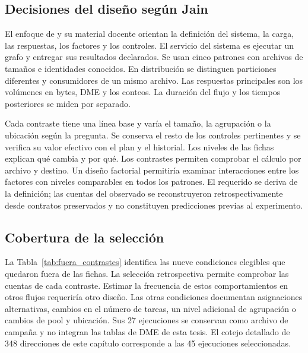 \subsection{Decisiones del diseño según Jain}
\label{sec:jain_diseno}
El enfoque de \citet{jain1991} y su material docente \citep{jain2017} orientan la definición del sistema, la carga, las respuestas, los factores y los controles. El servicio del sistema es ejecutar un grafo y entregar sus resultados declarados. Se usan cinco patrones con archivos de tamaños e identidades conocidos. En distribución se distinguen particiones diferentes y consumidores de un mismo archivo. Las respuestas principales son los volúmenes en bytes, DME y los conteos. La duración del flujo y los tiempos posteriores se miden por separado.

Cada contraste tiene una línea base y varía el tamaño, la agrupación o la ubicación según la pregunta. Se conserva el resto de los controles pertinentes y se verifica su valor efectivo con el plan y el historial. Los niveles de las fichas explican qué cambia y por qué. Los contrastes permiten comprobar el cálculo por archivo y destino. Un diseño factorial permitiría examinar interacciones entre los factores con niveles comparables en todos los patrones. El requerido se deriva de la definición; las cuentas del observado se reconstruyeron retrospectivamente desde contratos preservados y no constituyen predicciones previas al experimento.

\subsection*{Cobertura de la selección}
La Tabla~\ref{tab:fuera_contrastes} identifica las nueve condiciones elegibles que quedaron fuera de las fichas. La selección retrospectiva permite comprobar las cuentas de cada contraste. Estimar la frecuencia de estos comportamientos en otros flujos requeriría otro diseño. Las otras condiciones documentan asignaciones alternativas, cambios en el número de tareas, un nivel adicional de agrupación o cambios de pool y ubicación. Sus 27 ejecuciones se conservan como archivo de campaña y no integran las tablas de DME de esta tesis. El cotejo detallado de 348 direcciones de este capítulo corresponde a las 45 ejecuciones seleccionadas.

